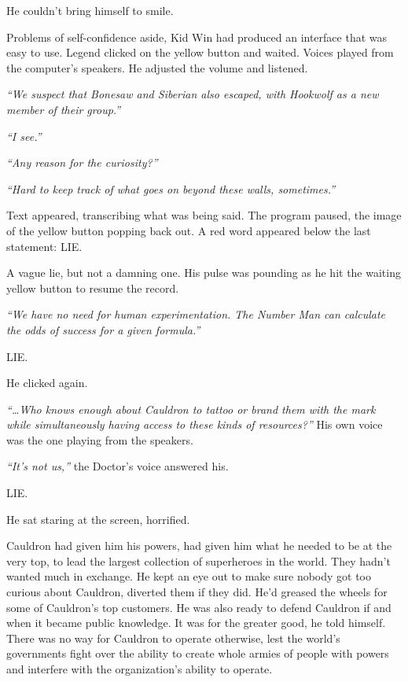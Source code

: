 He couldn't bring himself to smile.



Problems of self-confidence aside, Kid Win had produced an interface that was easy to use.  Legend clicked on the yellow button and waited.  Voices played from the computer's speakers.  He adjusted the volume and listened.



\emph{``We suspect that Bonesaw and Siberian also escaped, with Hookwolf as a new member of their group.''}



\emph{``I see.''}



\emph{``Any reason for the curiosity?''}



\emph{``Hard to keep track of what goes on beyond these walls, sometimes.''}



Text appeared, transcribing what was being said.  The program paused, the image of the yellow button popping back out.  A red word appeared below the last statement: LIE.



A vague lie, but not a damning one.  His pulse was pounding as he hit the waiting yellow button to resume the record.



\emph{``We have no need for human experimentation.  The Number Man can calculate the odds of success for a given formula.''}



LIE.



He clicked again.



\emph{``\ldots{}Who knows enough about Cauldron to tattoo or brand them with the mark while simultaneously having access to these kinds of resources?''  }His own voice was the one playing from the speakers.



\emph{``It's not us,''} the Doctor's voice answered his.



LIE.



He sat staring at the screen, horrified.



Cauldron had given him his powers, had given him what he needed to be at the very top, to lead the largest collection of superheroes in the world.  They hadn't wanted much in exchange.  He kept an eye out to make sure nobody got too curious about Cauldron, diverted them if they did.  He'd greased the wheels for some of Cauldron's top customers.  He was also ready to defend Cauldron if and when it became public knowledge.  It was for the greater good, he told himself.  There was no way for Cauldron to operate otherwise, lest the world's governments fight over the ability to create whole armies of people with powers and interfere with the organization's ability to operate.



